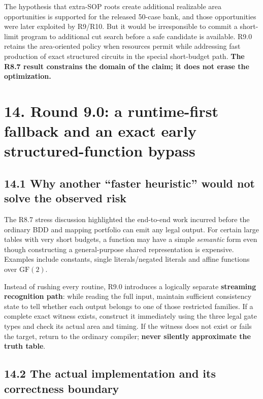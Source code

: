 \documentclass[a4paper,10pt]{article}
\theoremstyle{definition}
\theoremstyle{remark}
\begin{document}
The hypothesis that extra-SOP roots create additional realizable area opportunities is supported for the released 50-case bank, and those opportunities were later exploited by R9/R10. But it would be irresponsible to commit a short-limit program to additional cut search before a safe candidate is available. R9.0 retains the area-oriented policy when resources permit while addressing fast production of exact structured circuits in the special short-budget path. \textbf{The R8.7 result constrains the domain of the claim; it does not erase the optimization.}

\section{14. Round 9.0: a runtime-first fallback and an exact early structured-function bypass}\label{round-9.0-a-runtime-first-fallback-and-an-exact-early-structured-function-bypass}

\subsection{14.1 Why another ``faster heuristic'' would not solve the observed risk}\label{why-another-faster-heuristic-would-not-solve-the-observed-risk}

The R8.7 stress discussion highlighted the end-to-end work incurred before the ordinary BDD and mapping portfolio can emit any legal output. For certain large tables with very short budgets, a function may have a simple \emph{semantic} form even though constructing a general-purpose shared representation is expensive. Examples include constants, single literals/negated literals and affine functions over \(\mathrm{GF}(2)\).

Instead of rushing every routine, R9.0 introduces a logically separate \textbf{streaming recognition path}: while reading the full input, maintain sufficient consistency state to tell whether each output belongs to one of those restricted families. If a complete exact witness exists, construct it immediately using the three legal gate types and check its actual area and timing. If the witness does not exist or fails the target, return to the ordinary compiler; \textbf{never silently approximate the truth table}.

\subsection{14.2 The actual implementation and its correctness boundary}\label{the-actual-implementation-and-its-correctness-boundary}
\end{document}
